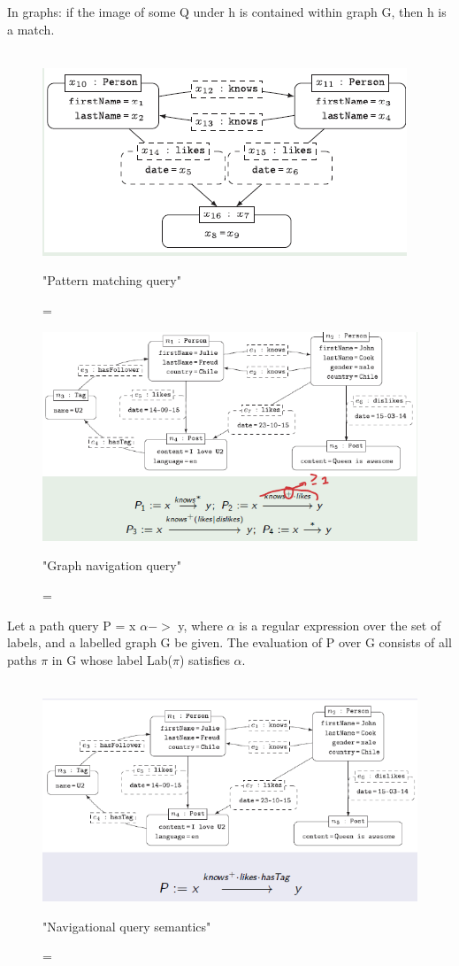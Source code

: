 \documentclass{article}
\begin{document}
In graphs: if the image of some Q under h is contained within graph G, then h is a match.\\\\
\begin{figure}
\includegraphics[scale=0.6]{24.png}
\caption= "Pattern matching query"
\end{figure}
\begin{figure}
\includegraphics[scale=0.6]{25.png}
\caption= "Graph navigation query"
\end{figure}
Let a path query P = x $\alpha->$ y, where $\alpha$ is a regular expression over the set of labels, and a labelled graph G be given. The evaluation of P over G consists of all paths $\pi$ in G whose label Lab($\pi$) satisfies $\alpha$.\\\\
\begin{figure}
\includegraphics[scale=0.6]{26.png}
\caption= "Navigational query semantics"
\end{figure}
\end{document}
